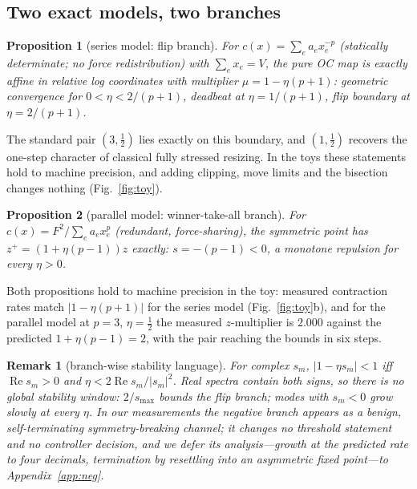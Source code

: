 \documentclass[11pt,a4paper]{article}
\newtheorem{proposition}{Proposition}
\newtheorem{remark}{Remark}
\newcommand{\smax}{s_{\max}}
\begin{document}
\subsection{Two exact models, two branches}

\begin{proposition}[series model: flip branch]\label{prop:series}
For $c(x)=\sum_e a_e x_e^{-p}$ (statically determinate; no force
redistribution) with $\sum_e x_e=V$, the pure OC map is exactly affine
in relative log coordinates with multiplier $\mu = 1-\eta(p+1)$:
geometric convergence for $0<\eta<2/(p{+}1)$, deadbeat at
$\eta=1/(p{+}1)$, flip boundary at $\eta=2/(p{+}1)$.
\end{proposition}

The standard pair $(3,\tfrac12)$ lies exactly on this boundary, and
$(1,\tfrac12)$ recovers the one-step character of classical fully
stressed resizing. In the toys these statements hold to machine
precision, and adding clipping, move limits and the bisection changes
nothing (Fig.~\ref{fig:toy}).

\begin{proposition}[parallel model: winner-take-all branch]\label{prop:parallel}
For $c(x)=F^2/\sum_e a_e x_e^{p}$ (redundant, force-sharing), the
symmetric point has $z^{+}=(1+\eta(p{-}1))z$ exactly: $s=-(p{-}1)<0$, a
monotone repulsion for every $\eta>0$.
\end{proposition}

Both propositions hold to machine precision in the toy: measured
contraction rates match $|1-\eta(p{+}1)|$ for the series model
(Fig.~\ref{fig:toy}b), and for the parallel model at $p=3$,
$\eta=\tfrac12$ the measured $z$-multiplier is $2.000$ against the
predicted $1+\eta(p{-}1)=2$, with the pair reaching the bounds in six
steps.

\begin{remark}[branch-wise stability language]\label{rem:branches}
For complex $s_m$, $|1-\eta s_m|<1$ iff $\operatorname{Re}s_m>0$ and
$\eta<2\operatorname{Re}s_m/|s_m|^2$. Real spectra contain both signs,
so there is no global stability window: $2/\smax$ bounds the \emph{flip
branch}; modes with $s_m<0$ grow slowly at every $\eta$. In our
measurements the negative branch appears as a benign, self-terminating
symmetry-breaking channel; it changes no threshold statement and no
controller decision, and we defer its analysis---growth at the predicted
rate to four decimals, termination by resettling into an asymmetric
fixed point---to Appendix~\ref{app:neg}.
\end{remark}
\end{document}

